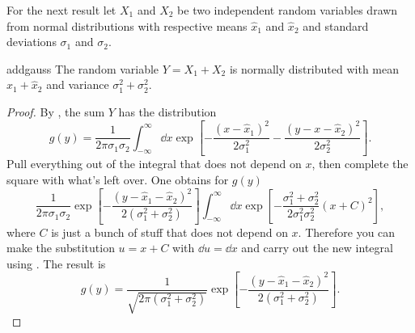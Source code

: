 For the next result 
let $X_1$ and $X_2$ be two independent random variables drawn from normal
distributions with respective means $\hat{x}_1$ and $\hat{x}_2$ and
standard deviations $\sigma_1$ and $\sigma_2$. 
\begin{proposition}{}{addgauss}
  The random variable $Y=X_1+X_2$ is normally distributed with mean
  $\hat{x}_1+\hat{x}_2$ and variance $\sigma_1^2+\sigma_2^2$.
  \begin{proof}
    By , the sum $Y$ has the distribution
    \begin{equation*}
      g(y)=\frac{1}{2\pi\sigma_1\sigma_2}
           \int_{-\infty}^\infty\dd{x}\exp\left[
             -\frac{(x-\hat{x}_1)^2}{2\sigma_1^2}
             -\frac{(y-x-\hat{x}_2)^2}{2\sigma_2^2}\right].
    \end{equation*}
    Pull everything out of the integral that does not depend on $x$,
    then complete the square with what's left over.
    One obtains for $g(y)$
    $$
      \frac{1}{2\pi\sigma_1\sigma_2}
           \exp\left[-\frac{(y-\hat{x}_1-\hat{x}_2)^2}
                      {2(\sigma_1^2+\sigma_2^2)}\right]
           \int_{-\infty}^\infty\dd{x}
           \exp\left[-\frac{\sigma_1^2+\sigma_2^2}
                     {2\sigma_1^2\sigma_2^2}(x+C)^2\right],
    $$
    where $C$ is just a bunch of stuff that does not depend on $x$.
    Therefore you can make the substitution $u=x+C$ with $\dd u=\dd x$ and
    carry out the new integral using .
    The result is
    \begin{equation*}
      g(y)=\frac{1}{\sqrt{2\pi(\sigma_1^2+\sigma_2^2)}}
           \exp\left[-\frac{(y-\hat{x}_1-\hat{x}_2)^2}
                      {2(\sigma_1^2+\sigma_2^2)}\right].
    \end{equation*}
  \end{proof}
\end{proposition}

